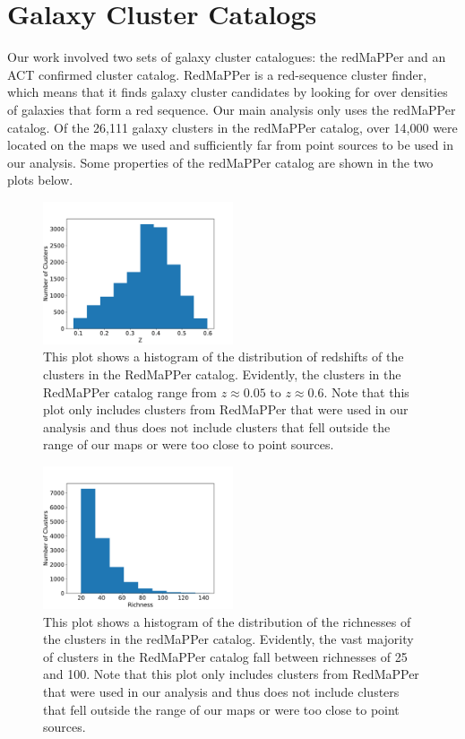 \documentclass{princeton_astro_thesis}
\begin{document}
\section{Galaxy Cluster Catalogs}
Our work involved two sets of galaxy cluster catalogues: the redMaPPer and an ACT confirmed cluster catalog. RedMaPPer is a red-sequence cluster finder, which means that it finds galaxy cluster candidates by looking for over densities of galaxies that form a red sequence. Our main analysis only uses the redMaPPer catalog. Of the 26,111 galaxy clusters in the redMaPPer catalog, over 14,000 were located on the maps we used and sufficiently far from point sources to be used in our analysis. Some properties of the redMaPPer catalog are shown in the two plots below.
\begin{figure}[h]
\centering
\includegraphics[width=0.5\textwidth]{../redmapper_z_hist.pdf}
\caption{This plot shows a histogram of the distribution of redshifts of the clusters in the RedMaPPer catalog. Evidently, the clusters in the RedMaPPer catalog range from $z\approx0.05$ to $z\approx0.6$. Note that this plot only includes clusters from RedMaPPer that were used in our analysis and thus does not include clusters that fell outside the range of our maps or were too close to point sources. }
\end{figure}

\begin{figure}[h]
\centering
\includegraphics[width=0.5\textwidth]{../redmapper_richness_hist.pdf}
\caption{This plot shows a histogram of the distribution of the richnesses of the clusters in the redMaPPer catalog. Evidently, the vast majority of clusters in the RedMaPPer catalog fall between richnesses of 25 and 100. Note that this plot only includes clusters from RedMaPPer that were used in our analysis and thus does not include clusters that fell outside the range of our maps or were too close to point sources. }
\end{figure}
\end{document}
